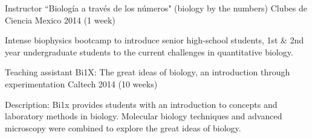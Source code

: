 \begin{cventries}
  \cventry
    {Instructor} %
    {``Biolog\'{i}a a trav\'{e}s de los n\'{u}meros" (biology by the numbers)} 
    {Clubes de Ciencia Mexico} %
    {2014 (1 week)} %
    {
      \begin{cvitems} %
        \item {Intense biophysics bootcamp to introduce senior high-school
        students, 1st \& 2nd year undergraduate students to the current
        challenges in quantitative biology.}
      \end{cvitems}
    }

  \cventry
    {Teaching assistant} %
    {Bi1X: The great ideas of biology, an introduction through experimentation}
    {Caltech} %
    {2014 (10 weeks)} %
    {
      \begin{cvitems} %
        \item {Description: Bi1x provides students with an introduction to
        concepts and laboratory methods in biology. Molecular biology
        techniques and advanced microscopy were combined to explore the great
        ideas of biology.}
      \end{cvitems}
    }

\end{cventries}
